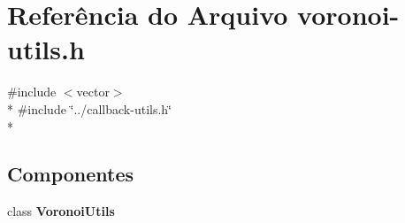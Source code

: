 \section{Referência do Arquivo voronoi-\/utils.h}
\label{voronoi-utils_8h}
{\ttfamily \#include $<$vector$>$}\\*
{\ttfamily \#include \char`\"{}../callback-\/utils.\+h\char`\"{}}\\*
\subsection*{Componentes}
\begin{DoxyCompactItemize}
\item 
class {\bf Voronoi\+Utils}
\end{DoxyCompactItemize}
